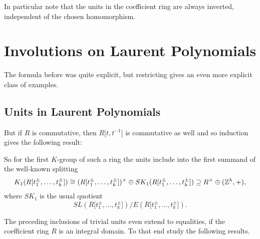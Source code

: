 In particular note that the units in the coefficient ring are always inverted, independent of the chosen homomorphism.

\section{Involutions on Laurent Polynomials}\label{invR1}

The formula before was quite explicit, but restricting gives an even more explicit class of examples.

\subsection{Units in Laurent Polynomials}


But if $R$ is commutative, then $R\lbrack t, t^{-1}\rbrack$ is commutative as well and so induction gives the following result:


So for the first $K$-group of such a ring the units include into the first summand of the well-known splitting
$$K_1(R\lbrack t_1^\pm,\ldots,t_k^\pm \rbrack) \cong (R\lbrack t_1^\pm,\ldots,t_k^\pm \rbrack)^\times \oplus SK_1(R\lbrack t_1^\pm,\ldots,t_k^\pm\rbrack) \supseteq R^\times \oplus (\mathbb{Z}^k,+),$$
where $SK_1$ is the usual quotient
$$SL(R\lbrack t_1^\pm,\ldots,t_k^\pm\rbrack)/E(R\lbrack t_1^\pm,\ldots,t_k^\pm\rbrack).$$

The preceding inclusions of trivial units even extend to equalities, if the coefficient ring $R$ is an integral domain. To that end
study the following results.


